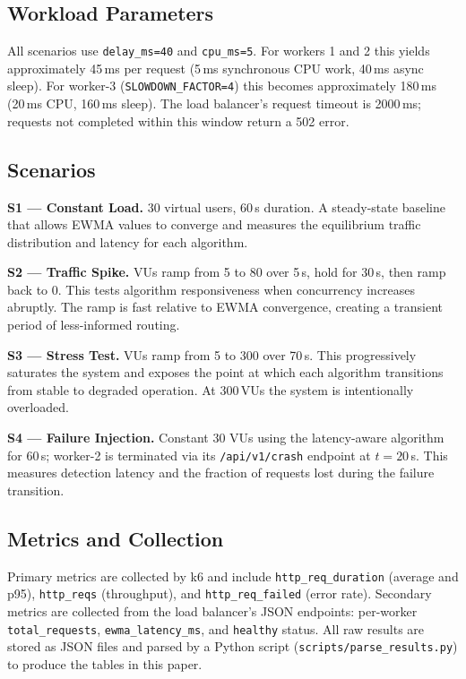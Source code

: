 \documentclass[conference]{IEEEtran}
\begin{document}
\subsection{Workload Parameters}

All scenarios use \texttt{delay\_ms=40} and \texttt{cpu\_ms=5}. For
workers 1 and 2 this yields approximately 45\,ms per request (5\,ms
synchronous CPU work, 40\,ms async sleep). For worker-3
(\texttt{SLOWDOWN\_FACTOR=4}) this becomes approximately 180\,ms
(20\,ms CPU, 160\,ms sleep). The load balancer's request timeout is
2000\,ms; requests not completed within this window return a 502 error.

\subsection{Scenarios}

\textbf{S1 --- Constant Load.} 30 virtual users, 60\,s duration.
A steady-state baseline that allows EWMA values to converge and
measures the equilibrium traffic distribution and latency for each
algorithm.

\textbf{S2 --- Traffic Spike.} VUs ramp from 5 to 80 over 5\,s, hold
for 30\,s, then ramp back to 0. This tests algorithm responsiveness
when concurrency increases abruptly. The ramp is fast relative to
EWMA convergence, creating a transient period of less-informed routing.

\textbf{S3 --- Stress Test.} VUs ramp from 5 to 300 over 70\,s.
This progressively saturates the system and exposes the point at which
each algorithm transitions from stable to degraded operation. At 300\,VUs
the system is intentionally overloaded.

\textbf{S4 --- Failure Injection.} Constant 30 VUs using the
latency-aware algorithm for 60\,s; worker-2 is terminated via its
\texttt{/api/v1/crash} endpoint at $t=20$\,s. This measures detection
latency and the fraction of requests lost during the failure transition.

\subsection{Metrics and Collection}

Primary metrics are collected by k6 and include \texttt{http\_req\_duration}
(average and p95), \texttt{http\_reqs} (throughput), and
\texttt{http\_req\_failed} (error rate). Secondary metrics are collected
from the load balancer's JSON endpoints: per-worker \texttt{total\_requests},
\texttt{ewma\_latency\_ms}, and \texttt{healthy} status. All raw results
are stored as JSON files and parsed by a Python script
(\texttt{scripts/parse\_results.py}) to produce the tables in this paper.
\end{document}
